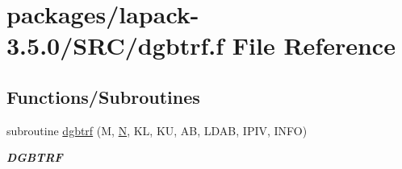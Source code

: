 \hypertarget{dgbtrf_8f}{}\section{packages/lapack-\/3.5.0/\+S\+R\+C/dgbtrf.f File Reference}
\label{dgbtrf_8f}
\subsection*{Functions/\+Subroutines}
\begin{DoxyCompactItemize}
\item 
subroutine \hyperlink{group__doubleGBcomputational_ga7fc91ba3f250ad3844eba25d59f5d7be}{dgbtrf} (M, \hyperlink{polmisc_8c_a0240ac851181b84ac374872dc5434ee4}{N}, K\+L, K\+U, A\+B, L\+D\+A\+B, I\+P\+I\+V, I\+N\+F\+O)
\begin{DoxyCompactList}\small\item\em {\bfseries D\+G\+B\+T\+R\+F} \end{DoxyCompactList}\end{DoxyCompactItemize}
